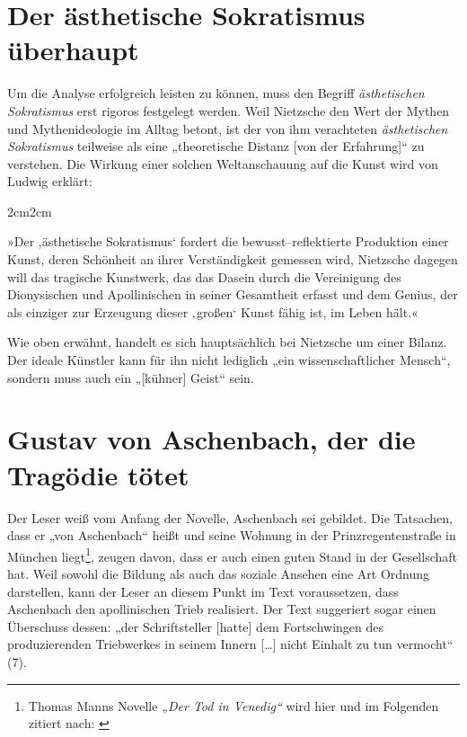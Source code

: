 \documentclass[12pt,a4paper]{article}
\newenvironment{longquote}
{%
    \vspace{-1.5em}
    \begin{adjustwidth}{2cm}{2cm}
        \fontsize{10}{12}\selectfont
        \singlespacing
        \itshape
    }
{%
    \end{adjustwidth}
}
\begin{document}
\clearpage

\section{Der ästhetische Sokratismus überhaupt}
Um die Analyse erfolgreich leisten zu können, muss den Begriff \textit{ästhetischen Sokratismus} erst rigoros festgelegt werden. Weil Nietzsche den Wert der Mythen und Mythenideologie im Alltag betont, ist der von ihm verachteten \textit{ästhetischen Sokratismus} teilweise als eine „theoretische Distanz [von der Erfahrung]“\autocite[143]{müller2002} zu verstehen. Die Wirkung einer solchen Weltanschauung auf die Kunst wird von Ludwig erklärt:

\begin{longquote}
    »Der ‚ästhetische Sokratismus‘ fordert die bewusst–reflektierte Produktion einer Kunst, deren Schönheit an ihrer Verständigkeit gemessen wird, Nietzsche dagegen will das tragische Kunstwerk, das das Dasein durch die Vereinigung des Dionysischen und Apollinischen in seiner Gesamtheit erfasst und dem Genius, der als einziger zur Erzeugung dieser ‚großen‘ Kunst fähig ist, im Leben hält.«\autocite[13]{ludwig}
\end{longquote}

Wie oben erwähnt, handelt es sich hauptsächlich bei Nietzsche um einer Bilanz. Der ideale Künstler kann für ihn nicht lediglich „ein wissenschaftlicher Mensch“\autocite[84]{müller2017}, sondern muss auch ein „[kühner] Geist“\autocite{müller2017} sein.

\section{Gustav von Aschenbach, der die Tragödie tötet}
Der Leser weiß vom Anfang der Novelle, Aschenbach sei gebildet. Die Tatsachen, dass er „von Aschenbach“ heißt und seine Wohnung in der Prinzregentenstraße in München liegt\footnote{Thomas Manns Novelle \textit{„Der Tod in Venedig“} wird hier und im Folgenden zitiert nach: \cite[Hier: 7]{mann2025}}, zeugen davon, dass er auch einen guten Stand in der Gesellschaft hat. Weil sowohl die Bildung als auch das soziale Ansehen eine Art Ordnung darstellen, kann der Leser an diesem Punkt im Text voraussetzen, dass Aschenbach den apollinischen Trieb realisiert. Der Text suggeriert sogar einen Überschuss dessen: „der Schriftsteller [hatte] dem Fortschwingen des produzierenden Triebwerkes in seinem Innern […] nicht Einhalt zu tun vermocht“ (7).\par
\end{document}
